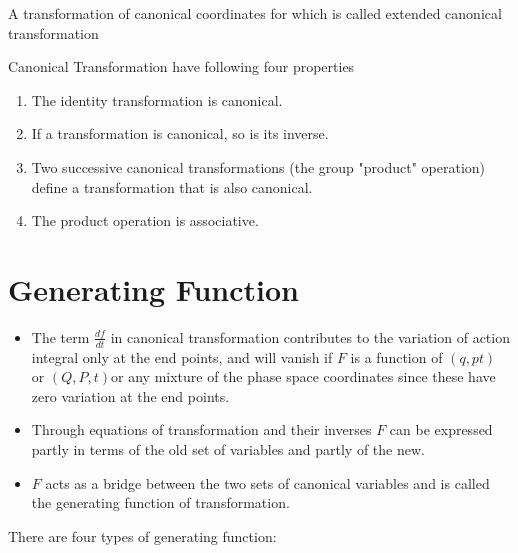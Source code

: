 \begin{note}
	A transformation of canonical coordinates for which is called extended canonical transformation
\end{note}
Canonical Transformation have following four properties
\begin{enumerate}
	\item The identity transformation is canonical.
	\item If a transformation is canonical, so is its inverse.
	\item Two successive canonical transformations (the group "product" operation) define a transformation that is also canonical.
	\item The product operation is associative.
\end{enumerate}
\section{Generating Function}
\begin{itemize}
	\item The term $\frac{df}{dt}$ in canonical transformation contributes to the variation of action integral only at the end points, and will vanish if $F$ is a function of $(q,p t)$ or $(Q,P,t)$or any mixture of the phase space coordinates since these have zero variation at the end points.
	\item Through equations of transformation and their inverses $F$ can be expressed partly in terms of the old set of variables and partly of the new.
	\item $F$ acts as a bridge between the two sets of canonical variables and is called the generating function of transformation.
\end{itemize}
There are four types of generating function:
